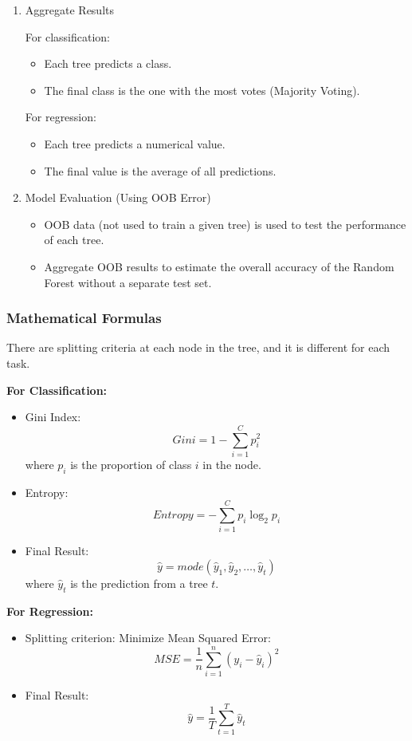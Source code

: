 \begin{enumerate}[label=Step \arabic*:, align=left, leftmargin=20pt,labelsep=1em]
    \item Aggregate Results

    \smallskip
    For classification:
    \begin{itemize}
        \item Each tree predicts a class.
        \item The final class is the one with the most votes (Majority Voting).
    \end{itemize}

    \smallskip
    For regression:
    \begin{itemize}
        \item Each tree predicts a numerical value.
        \item The final value is the average of all predictions.
    \end{itemize}

    \item Model Evaluation (Using OOB Error)
    \begin{itemize}
        \item OOB data (not used to train a given tree) is used to test the performance of each tree.
        \item Aggregate OOB results to estimate the overall accuracy of the Random Forest without a separate test set.
    \end{itemize}
\end{enumerate}

\smallskip
\subsubsection{Mathematical Formulas}\text{}

There are splitting criteria at each node in the tree, and it is different for each task.

\textbf{For Classification:}
\begin{itemize}
    \item Gini Index:
        \[Gini = 1 - \sum_{i=1}^C{p_i^2}\]
        where $p_i$ is the proportion of class $i$ in the node.
    \item Entropy:
        \[Entropy = - \sum_{i=1}^C{p_i \log_2{p_i}}\]
    \item Final Result:
        \[\hat{y} = mode(\hat{y}_1, \hat{y}_2, \ldots, \hat{y}_t)\]
        where $\hat{y}_t$ is the prediction from a tree $t$.
\end{itemize}

\textbf{For Regression:}
\begin{itemize}
    \item Splitting criterion: Minimize Mean Squared Error:
        \[MSE = \frac{1}{n} \sum_{i=1}^n{(y_i - \hat{y}_i)^2}\]
    \item Final Result:
        \[\hat{y} = \frac{1}{T} \sum_{t=1}^T{\hat{y}_t}\]
\end{itemize}

